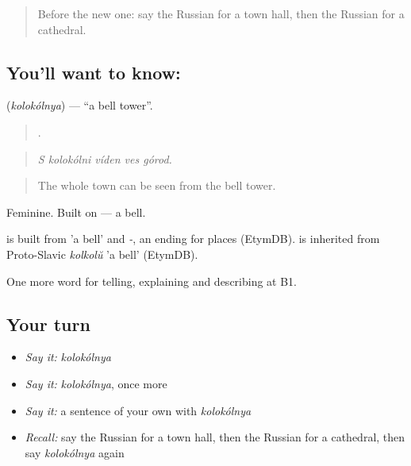 \label{lesson:RU-C444-kolokolnya}



\begin{quote}
Before the new one: say the Russian for a town hall, then the Russian for a cathedral.
\end{quote}

\subsection*{You'll want to know: }
\textbf{} (\emph{kolokólnya}) — \textquotedblleft{}a bell tower\textquotedblright{}.

\begin{quote}
    .
\end{quote}

\begin{quote}
\emph{S kolokólni víden ves górod.}
\end{quote}

\begin{quote}
The whole town can be seen from the bell tower.
\end{quote}

Feminine. Built on \emph{} — a bell.

\begin{cousinweb}
\emph{} is built from \emph{} 'a bell' and \emph{-}, an ending for places (EtymDB). \emph{} is inherited from Proto-Slavic \emph{kolkolŭ} 'a bell' (EtymDB).
\end{cousinweb}

\begin{grammarlens}[title={What you've built}]
One more word for telling, explaining and describing at B1.
\end{grammarlens}

\subsection*{Your turn}
\begin{itemize}
\raggedright
  \item \emph{Say it:} \emph{kolokólnya}
  \item \emph{Say it:} \emph{kolokólnya}, once more
  \item \emph{Say it:} a sentence of your own with \emph{kolokólnya}
  \item \emph{Recall:} say the Russian for a town hall, then the Russian for a cathedral, then say \emph{kolokólnya} again
\end{itemize}

